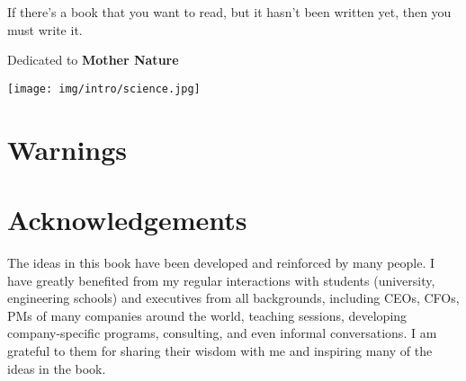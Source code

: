 \documentclass[12pt,a4paper,twoside,openright]{report}
\theoremstyle{definition}
\theoremstyle{itexmp}
\numberwithin{equation}{section}
\newenvironment{dedication}
  {\clearpage           %
   \thispagestyle{empty}%
   \vspace*{\stretch{1}}%
   \itshape             %
   \raggedleft          %
  }
  {\par %
   \vspace{\stretch{3}} %
   \clearpage           %
  }
\begin{document}
	\begin{fquote}If there's a book that you want to read, but it hasn't been written yet, then you must write it.
 	\end{fquote}
	\newpage\null\thispagestyle{empty}\newpage %
	\dominitoc
	\pagebreak
	\renewcommand{\contentsname}{Table of Contents}
	\tableofcontents
	\newpage\null\thispagestyle{empty}\newpage
	\setlength{\parskip}{12pt}
	\clearpage %
	\pagestyle{fancy} %
	\renewcommand{\chaptermark}[1]{\markboth{\thechapter.\space#1}{}}
	\renewcommand{\sectionmark}[1]{\markright{#1}}
	\fancyhead[LE,RO]{\nouppercase\leftmark~(\nouppercase\rightmark)} %
	\renewcommand{\footrulewidth}{1pt}
	\fancyfoot[C]{}
	\let\cleardoublepage\clearpage

	\begin{dedication}
	{\LARGE Dedicated to \textbf{Mother Nature}}
	\begin{flushright}
	\texttt{[image: img/intro/science.jpg]}
	\end{flushright}
	\end{dedication}
	

	\chapter{Warnings}
	\minitoc
	
	
	
	\chapter{Acknowledgements}

	The ideas in this book have been developed and reinforced by many people. I have greatly benefited from my regular interactions with  students (university, engineering schools) and executives from all backgrounds, including CEOs, CFOs, PMs of many companies around the world, teaching sessions, developing company-specific programs, consulting, and even informal conversations. I am grateful to them for sharing their wisdom with me and inspiring many of the ideas in the book.
\end{document}

